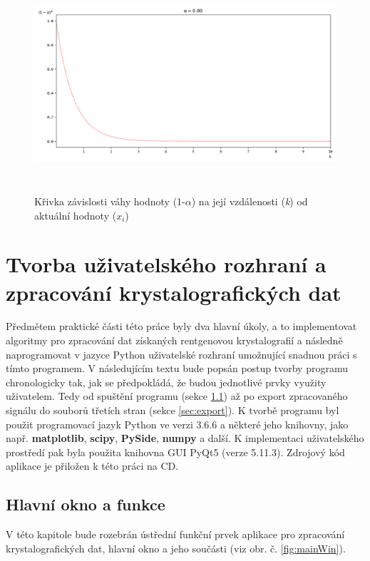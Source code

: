\documentclass[a4paper, 12pt]{article}
\begin{document}
\begin{figure}[hbt!]
    \centering
    \includegraphics[width=\linewidth,height=8cm]{EMAexp1.png}
    \caption{Křivka závislosti váhy hodnoty (1-$\alpha$) na její vzdálenosti (\textit{k}) od aktuální hodnoty (\textit{$x_i$})}
    \label{fig:EMAexp}
\end{figure}

\clearpage
\section{Tvorba uživatelského rozhraní a zpracování krystalografických dat} \label{sec:prakticka}
Předmětem praktické části této práce byly dva hlavní úkoly, a to implementovat algoritmy pro zpracování dat získaných rentgenovou krystalografií a následně naprogramovat v jazyce Python uživatelské rozhraní umožnující snadnou práci s tímto programem. V následujícím textu bude popsán postup tvorby programu chronologicky tak, jak se předpokládá, že budou jednotlivé prvky využity uživatelem. Tedy od spuštění programu (sekce \ref{sec:mainwin}) až po export zpracovaného signálu do souborů třetích stran (sekce \ref{sec:export}). K tvorbě programu byl použit programovací jazyk Python ve verzi 3.6.6 a některé jeho knihovny, jako např. \textbf{matplotlib}, \textbf{scipy}, \textbf{PySide}, \textbf{numpy} a další. K implementaci uživatelského prostředí pak byla použita knihovna GUI PyQt5 (verze 5.11.3). \textcolor{cdorange}{Zdrojový kód aplikace je přiložen k této práci na CD}.

\subsection{Hlavní okno a funkce} \label{sec:mainwin}
V této kapitole bude rozebrán ústřední funkční prvek aplikace pro zpracování krystalografických dat, hlavní okno a jeho součásti (viz obr. č. \ref{fig:mainWin}).
\end{document}
